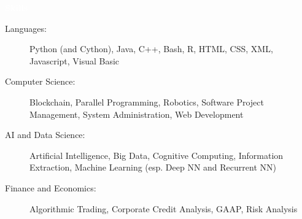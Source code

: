 \documentclass[letterpaper,11pt]{article}
\newcommand{\resheading}[1]{{\large \colorbox{mypurple}{\begin{minipage}{\textwidth}{\textbf{#1 \vphantom{p\^{E}}}}\end{minipage}}}}
\begin{document}
	\resheading{\textcolor{white}{Skills}}
	
	\begin{description}
		\item[Languages:] Python (and Cython), Java, C++, Bash, R, HTML, CSS, XML, Javascript, Visual Basic
		\item[Computer Science:]  Blockchain, Parallel Programming, Robotics, Software Project Management, System Administration, Web Development
		\item[AI and Data Science:] Artificial Intelligence, Big Data, Cognitive Computing, Information Extraction, Machine Learning (esp. Deep NN and Recurrent NN)
		\item[Finance and Economics:] Algorithmic Trading, Corporate Credit Analysis, GAAP, Risk Analysis
	\end{description}
	
\end{document}
